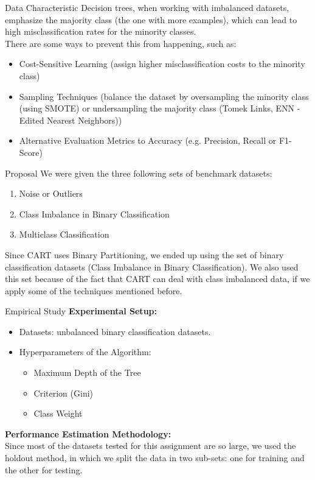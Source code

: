 \documentclass{beamer}
\begin{document}
\begin{frame}{Data Characteristic}
    Decision trees, when working with imbalanced datasets, 
    emphasize the majority class (the one with more examples), 
    which can lead to high misclassification rates for the 
    minority classes. \\
    There are some ways to prevent this from happening, such as:
    \begin{itemize}
        \item Cost-Sensitive Learning (assign higher misclassification costs 
        to the minority class)
        \item Sampling Techniques (balance the dataset by oversampling 
        the minority class (using SMOTE) or undersampling 
        the majority class (Tomek Links, ENN - Edited Nearest
        Neighbors))
        \item Alternative Evaluation Metrics to Accuracy (e.g. Precision, Recall or
        F1-Score)
    \end{itemize}
\end{frame}

\begin{frame}{Proposal}
We were given the three following sets 
    of benchmark datasets:
    \begin{enumerate}
       \item Noise or Outliers 
       \item Class Imbalance in Binary Classification
       \item Multiclass Classification 
    \end{enumerate}
    Since CART uses Binary Partitioning, we ended up using the 
    set of binary classification datasets 
    (Class Imbalance in Binary Classification). We also used this 
    set because of the fact that CART can deal with class 
    imbalanced data, if we apply some of the techniques mentioned 
    before. 
\end{frame}      

\begin{frame}{Empirical Study}
    \textbf{Experimental Setup:} 
    \begin{itemize} 
        \item Datasets: unbalanced binary classification datasets. 
        \item Hyperparameters of the Algorithm:
        \begin{itemize}
            \item Maximum Depth of the Tree 
            \item Criterion (Gini)
            \item Class Weight 
        \end{itemize}
    \end{itemize} 
    \pause
    \textbf{Performance Estimation Methodology:} \\ Since most 
    of the datasets tested for this assignment are so large, we used
    the holdout method, in which we split the data in two 
    sub-sets: one for training and the other for testing.
\end{frame}
\end{document}

